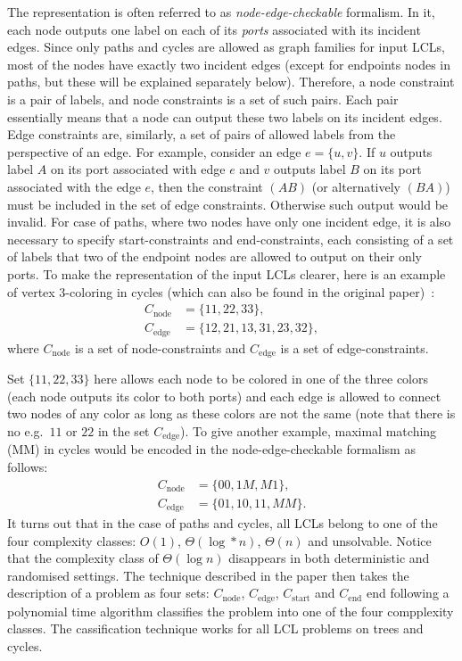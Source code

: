 The representation is often referred to as \emph{node-edge-checkable} formalism.
In it, each node outputs one label on each of its \emph{ports} associated with
its incident edges. Since only paths and cycles are allowed as graph families for
input LCLs, most of the nodes have exactly two incident edges (except for endpoints nodes
in paths, but these will be explained separately below). Therefore, a node constraint
is a pair of labels, and node constraints is a set of such pairs. Each pair essentially
means that a node can output these two labels on its incident edges. Edge constraints are,
similarly, a set of pairs of allowed labels from the perspective of an edge. For example,
consider an edge $e = \{u, v\}$. If $u$ outputs label $A$ on its port associated with edge $e$
and $v$ outputs label $B$ on its port associated with the edge $e$, then the constraint $(AB)$
(or alternatively $(BA)$) must be included in the set of edge constraints. Otherwise such output
would be invalid. For case of paths, where two nodes have only one incident edge, it is also
necessary to specify start-constraints and end-constraints, each consisting of a set of labels
that two of the endpoint nodes are allowed to output on their only ports. To make the
representation of the input LCLs clearer, here is an example of vertex 3-coloring in cycles
(which can also be found in the original paper)~\cite{Chang2020}:
\begin{align*}
  C_{\textrm{node}} &= \{ 11, 22, 33 \}, \\
  C_{\textrm{edge}} &= \{ 12, 21, 13, 31, 23, 32 \},
\end{align*}
where $C_{\textrm{node}}$ is a set of node-constraints and $C_{\textrm{edge}}$ is a set of edge-constraints.

Set $\{ 11, 22, 33 \}$ here allows each node to be colored in one of the three colors
(each node outputs its color to both ports) and each edge is allowed to connect
two nodes of any color as long as these colors are not the same (note that there is no
e.g.\ $11$ or $22$ in the set $C_{\textrm{edge}}$). To give another example, maximal matching (MM) in cycles
would be encoded in the node-edge-checkable formalism as follows:
\begin{align*}
C_{\textrm{node}} &= \{ 00, 1M, M1 \}, \\
C_{\textrm{edge}} &= \{ 01, 10, 11, MM \}.
\end{align*}
It turns out that in the case of paths and cycles, all LCLs belong to one of the four
complexity classes: $O(1)$, $\Theta(\log* n)$, $\Theta(n)$ and unsolvable. Notice that
the complexity class of $\Theta(\log n)$ disappears in both deterministic and randomised settings.
The technique described in the paper then takes the description of a problem as four sets: $C_{\textrm{node}}$,
$C_{\textrm{edge}}$, $C_{\textrm{start}}$ and $C_{\textrm{end}}$ end following a polynomial time algorithm classifies the
problem into one of the four compplexity classes. The cassification technique works for all LCL
problems on trees and cycles.

